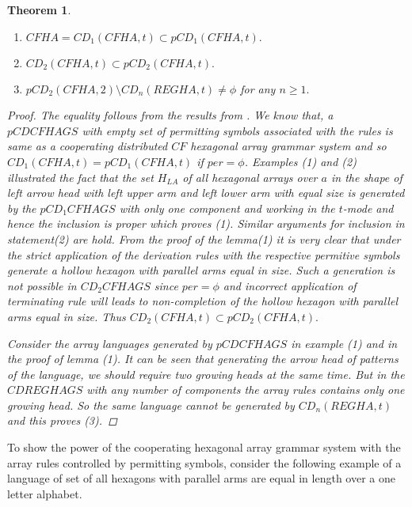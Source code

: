 \documentclass[11pt]{article}
\newtheorem{theorem}{Theorem}[section]
\begin{document}
\begin{theorem}
\begin{enumerate}
\item $CFHA= CD_{1}(CFHA,t) \subset pCD_{1}(CFHA,t).$ \item
$CD_{2}(CFHA,t) \subset pCD_{2}(CFHA,t).$ \item $
pCD_{2}(CFHA,2)\setminus CD_{n}(REGHA,t) \neq\phi $ for any $n\geq
1.$
\end{enumerate}
\begin{proof}
The equality follows from the results from \cite{8}. We know that,
a $pCDCFHAGS$ with empty set of permitting symbols associated with
the rules is same as a cooperating distributed $CF$ hexagonal
array grammar system and so $CD_{1}(CFHA,t) =pCD_{1}(CFHA,t)$ if
$per=\phi$. Examples (1) and (2) illustrated the fact that the set
$H_{LA}$ of all hexagonal arrays over ${a}$ in the shape of left
arrow head with left upper arm and left lower arm with equal size
is generated by the $pCD_{1}CFHAGS$ with only one component and
working in the $t$-mode and hence the inclusion is proper which
proves (1). Similar arguments for inclusion in statement(2) are
hold. From the proof of the lemma(1) it is very clear that under
the strict application of the derivation rules with the respective
permitive symbols generate a hollow hexagon with parallel arms
equal in size. Such a generation is not possible in $
CD_{2}CFHAGS$ since $ per =\phi$  and incorrect application of
terminating rule will leads to non-completion of the hollow
hexagon with parallel arms equal in size. Thus $CD_{2}(CFHA,t)
\subset pCD_{2}(CFHA,t).$

Consider the array languages generated by $pCDCFHAGS$ in example
(1) and in the proof of lemma (1). It can be seen that generating
the arrow head of patterns of the language, we should require two
growing heads at the same time. But in the $ CDREGHAGS$ with any
number of components the array rules contains only one growing
head. So the same language cannot be generated by
$CD_{n}(REGHA,t)$ and this proves (3).
\end{proof}
\end{theorem}
To show the power of the cooperating hexagonal array grammar system with the array rules controlled by permitting symbols, consider the following example of a language of set of all hexagons with parallel arms are equal in length over a one letter alphabet.
\end{document}
